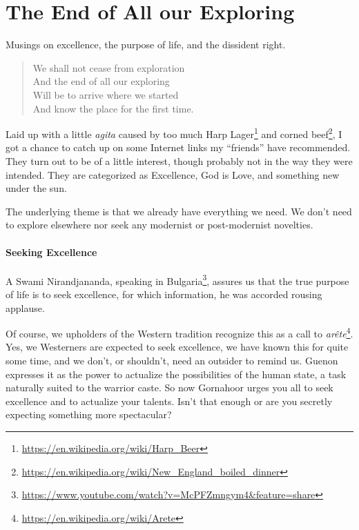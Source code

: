 \section{The End of All our Exploring}

Musings on excellence, the purpose of life, and the dissident right.

\begin{quotex}
\begin{verse}
We shall not cease from exploration\\ And the end of all our exploring\\ Will be to arrive where we started\\ And know the place for the first time.
\end{verse}
\end{quotex}


Laid up with a little \emph{agita} caused by too much Harp Lager\footnote{\url{https://en.wikipedia.org/wiki/Harp_Beer}} and corned beef\footnote{\url{https://en.wikipedia.org/wiki/New_England_boiled_dinner}}, I got a chance to catch up on some Internet links my ``friends'' have recommended. They turn out to be of a little interest, though probably not in the way they were intended. They are categorized as Excellence, God is Love, and something new under the sun.

The underlying theme is that we already have everything we need. We don't need to explore elsewhere nor seek any modernist or post-modernist novelties.

\paragraph{Seeking Excellence}


A Swami Nirandjananda, speaking in Bulgaria\footnote{\url{https://www.youtube.com/watch?v=McPFZmngym4&feature=share}}, assures us that the true purpose of life is to seek excellence, for which information, he was accorded rousing applause.

Of course, we upholders of the Western tradition recognize this as a call to \emph{arête}\footnote{\url{https://en.wikipedia.org/wiki/Arete}}. Yes, we Westerners are expected to seek excellence, we have known this for quite some time, and we don't, or shouldn't, need an outsider to remind us. Guenon expresses it as the power to actualize the possibilities of the human state, a task naturally suited to the warrior caste. So now Gornahoor urges you all to seek excellence and to actualize your talents. Isn't that enough or are you secretly expecting something more spectacular?

